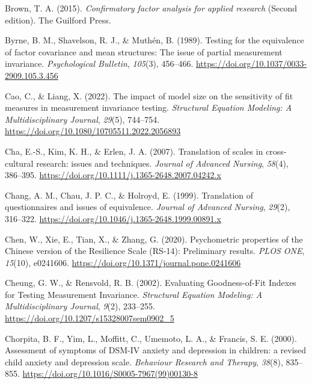 \documentclass[
  man]{apa7}
\newlength{\cslhangindent}
\newlength{\cslentryspacingunit} %
\newenvironment{CSLReferences}[2] %
 {%
  \setlength{\parindent}{0pt}
  \ifodd #1
  \let\oldpar\par
  \def\par{\hangindent=\cslhangindent\oldpar}
  \fi
  \setlength{\parskip}{#2\cslentryspacingunit}
 }%
 {}
\begin{document}
\begin{CSLReferences}{1}{0}
\leavevmode{}%
Brown, T. A. (2015). \emph{Confirmatory factor analysis for applied research} (Second edition). The Guilford Press.

\leavevmode{}%
Byrne, B. M., Shavelson, R. J., \& Muthén, B. (1989). Testing for the equivalence of factor covariance and mean structures: The issue of partial measurement invariance. \emph{Psychological Bulletin}, \emph{105}(3), 456--466. \url{https://doi.org/10.1037/0033-2909.105.3.456}

\leavevmode{}%
Cao, C., \& Liang, X. (2022). The impact of model size on the sensitivity of fit measures in measurement invariance testing. \emph{Structural Equation Modeling: A Multidisciplinary Journal}, \emph{29}(5), 744--754. \url{https://doi.org/10.1080/10705511.2022.2056893}

\leavevmode{}%
Cha, E.-S., Kim, K. H., \& Erlen, J. A. (2007). Translation of scales in cross{-}cultural research: issues and techniques. \emph{Journal of Advanced Nursing}, \emph{58}(4), 386--395. \url{https://doi.org/10.1111/j.1365-2648.2007.04242.x}

\leavevmode{}%
Chang, A. M., Chau, J. P. C., \& Holroyd, E. (1999). Translation of questionnaires and issues of equivalence. \emph{Journal of Advanced Nursing}, \emph{29}(2), 316--322. \url{https://doi.org/10.1046/j.1365-2648.1999.00891.x}

\leavevmode{}%
Chen, W., Xie, E., Tian, X., \& Zhang, G. (2020). Psychometric properties of the Chinese version of the Resilience Scale (RS-14): Preliminary results. \emph{PLOS ONE}, \emph{15}(10), e0241606. \url{https://doi.org/10.1371/journal.pone.0241606}

\leavevmode{}%
Cheung, G. W., \& Rensvold, R. B. (2002). Evaluating Goodness-of-Fit Indexes for Testing Measurement Invariance. \emph{Structural Equation Modeling: A Multidisciplinary Journal}, \emph{9}(2), 233--255. \url{https://doi.org/10.1207/s15328007sem0902_5}

\leavevmode{}%
Chorpita, B. F., Yim, L., Moffitt, C., Umemoto, L. A., \& Francis, S. E. (2000). Assessment of symptoms of DSM-IV anxiety and depression in children: a revised child anxiety and depression scale. \emph{Behaviour Research and Therapy}, \emph{38}(8), 835--855. \url{https://doi.org/10.1016/S0005-7967(99)00130-8}


\end{CSLReferences}
\end{document}
